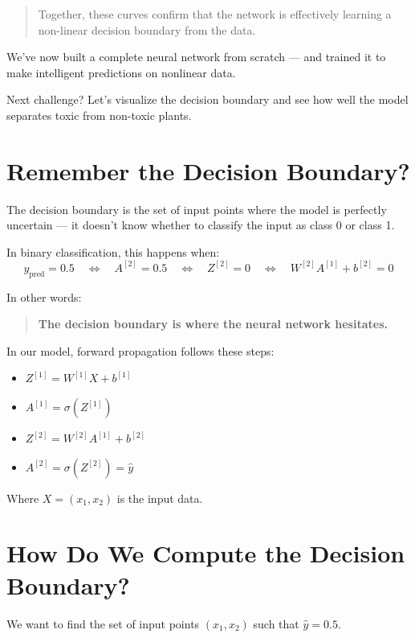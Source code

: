 \documentclass[11pt]{article}
\begin{document}
\begin{quote}
Together, these curves confirm that the network is effectively learning a non-linear decision boundary from the data.
\end{quote}


\noindent We’ve now built a complete neural network from scratch —  
and trained it to make intelligent predictions on nonlinear data.

\vspace{0.5em}

\noindent Next challenge?  
Let’s visualize the decision boundary and see how well the model separates toxic from non-toxic plants.
\section*{Remember the Decision Boundary?}

The decision boundary is the set of input points where the model is perfectly uncertain —  
it doesn't know whether to classify the input as class 0 or class 1.

In binary classification, this happens when:
\[
y_{\text{pred}} = 0.5
\quad \Leftrightarrow \quad
A^{[2]} = 0.5 \quad \Leftrightarrow \quad Z^{[2]} = 0
\quad \Leftrightarrow \quad W^{[2]} A^{[1]} + b^{[2]} = 0
\]

In other words:
\begin{quote}
\textbf{The decision boundary is where the neural network hesitates.}
\end{quote}

In our model, forward propagation follows these steps:

\begin{itemize}
    \item $Z^{[1]} = W^{[1]} X + b^{[1]}$
    \item $A^{[1]} = \sigma(Z^{[1]})$
    \item $Z^{[2]} = W^{[2]} A^{[1]} + b^{[2]}$
    \item $A^{[2]} = \sigma(Z^{[2]}) = \hat{y}$
\end{itemize}

Where $X = (x_1, x_2)$ is the input data.

\section*{How Do We Compute the Decision Boundary?}

We want to find the set of input points $(x_1, x_2)$ such that $\hat{y} = 0.5$.
\end{document}
